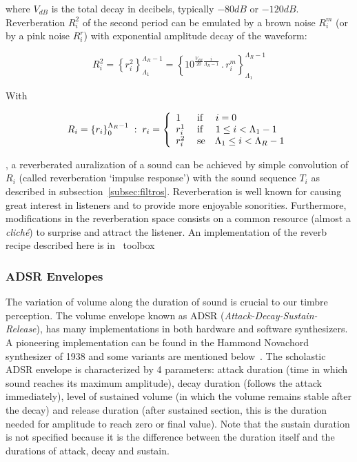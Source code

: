\noindent where $V_{dB}$ is the total decay in decibels, typically $-80dB$ or $-120dB$. Reverberation $R_i^2$ of the second period can be emulated by a brown noise $R_i^m$ (or by a pink noise $R_i^r$) with exponential amplitude decay of the waveform:

\begin{equation}\label{eq:p2rev}
    R_i^2=\left\{r_i^2\right\}_{\Lambda_1}^{\Lambda_R-1}=\left\{10^{\frac{V_{dB}}{20}\frac{i}{\Lambda_R-1}}\,.\,r_i^m\right\}_{\Lambda_1}^{\Lambda_R-1}
\end{equation}

With

\begin{equation}\label{eq:rev}
    R_i=\left\{r_i\right\}_0^{\Lambda_R-1}\;:\;r_i=\left\{
        \begin{array}{l l}
            1\; & \text{if }\quad i=0 \\
            r_i^1\;  & \text{if }\quad 1\leq i<\Lambda_1-1 \\
                                     r_i^2 \; & \text{se}\quad \Lambda_1 \leq i < \Lambda_R-1 \\
        \end{array} \right.
\end{equation}

\noindent, a reverberated auralization of a sound can be achieved by simple convolution of $R_i$ (called reverberation `impulse response') with the sound sequence $T_i$ as described in subsection~\ref{subsec:filtros}. Reverberation is well known for causing great interest in listeners and to provide more enjoyable sonorities. Furthermore, modifications in the reverberation space consists on a common resource (almost a \textit{clich\'{e}}) to surprise and attract the listener. An implementation of the reverb recipe described here is in \massa\ toolbox~\cite{MASSA}


\subsubsection{ADSR Envelopes}

The variation of volume along the duration of sound is crucial to our timbre perception. The volume envelope known as ADSR (\emph{Attack-Decay-Sustain-Release}), has many implementations in both hardware and software synthesizers. A pioneering implementation can be found in the Hammond Novachord synthesizer of 1938 and some variants are mentioned below~\cite{ADSR}. The scholastic ADSR envelope is characterized by 4 parameters: attack duration (time in which sound reaches its maximum amplitude), decay duration (follows the attack immediately), level of sustained volume (in which the volume remains stable after the decay) and release duration (after sustained section, this is the duration needed for amplitude to reach zero or final value).
Note that the sustain duration is not specified because it is the difference between the duration itself and the durations of attack, decay and sustain.


